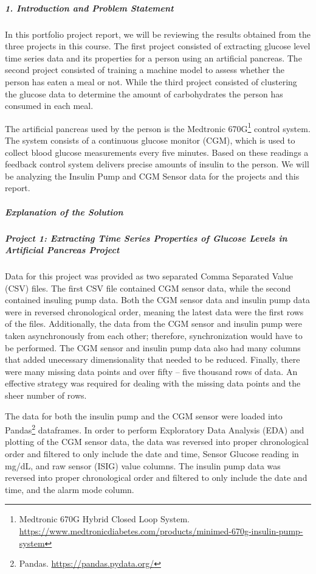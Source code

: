 \subparagraph{1. Introduction and Problem Statement}

In this portfolio project report, we will be reviewing the results obtained from the three projects in this course.  The first project consisted of extracting glucose level time series data and its properties for a person using an artificial pancreas.  The second project consisted of training a machine model to assess whether the person has eaten a meal or not.  While the third project consisted of clustering the glucose data to determine the amount of carbohydrates the person has consumed in each meal.

The artificial pancreas used by the person is the Medtronic 670G\footnote{Medtronic 670G Hybrid Closed Loop System. \href{https://www.medtronicdiabetes.com/products/minimed-670g-insulin-pump-system}{https://www.medtronicdiabetes.com/products/minimed-670g-insulin-pump-system}} control system.  The system consists of a continuous glucose monitor (CGM), which is used to collect blood glucose measurements every five minutes.  Based on these readings a feedback control system delivers precise amounts of insulin to the person.  We will be analyzing the Insulin Pump and CGM Sensor data for the projects and this report.

\subparagraph{Explanation of the Solution}

\subparagraph{Project 1: Extracting Time Series Properties of Glucose Levels in Artificial Pancreas Project}

Data for this project was provided as two separated Comma Separated Value (CSV) files.  The first CSV file contained CGM sensor data, while the second contained insuling pump data.  Both the CGM sensor data and insulin pump data were in reversed chronological order, meaning the latest data were the first rows of the files.  Additionally, the data from the CGM sensor and insulin pump were taken asynchronously from each other; therefore, synchronization would have to be performed.  The CGM sensor and insulin pump data also had many columns that added unecessary dimensionality that needed to be reduced.  Finally, there were many missing data points and over fifty -- five thousand rows of data.  An effective strategy was required for dealing with the missing data points and the sheer number of rows.

The data for both the insulin pump and the CGM sensor were loaded into Pandas\footnote{Pandas. \href{https://pandas.pydata.org/}{https://pandas.pydata.org/}} dataframes.  In order to perform Exploratory Data Analysis (EDA) and plotting of the CGM sensor data, the data was reversed into proper chronological order and filtered to only include the date and time, Sensor Glucose reading in mg/dL, and raw sensor (ISIG) value columns.  The insulin pump data was reversed into proper chronological order and filtered to only include the date and time, and the alarm mode column.

